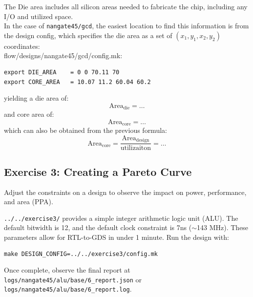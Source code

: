 \documentclass[a4paper,12pt,twoside]{article}
\begin{document}
\begin{enumerate}
\begin{equation}
    \end{equation}
    The Die area includes all silicon areas needed to fabricate the chip, including any I/O and utilized space.\\
    In the case of \texttt{nangate45/gcd}, the easiest location to find this information is from the design config, which specifies the die area as a set of $(x_1,y_1,x_2,y_2)$ coordinates:\\
    flow/designs/nangate45/gcd/config.mk:
    \begin{verbatim}
export DIE_AREA    = 0 0 70.11 70
export CORE_AREA   = 10.07 11.2 60.04 60.2
    \end{verbatim}
    yielding a die area of:
    \begin{equation}\label{EEq2}
        \mathrm{Area_{die}=}\dots
    \end{equation}
    and core area of:
    \begin{equation}\label{EEq3}
        \mathrm{Area_{core}=}\dots
    \end{equation}
    which can also be obtained from the previous formula:
    \begin{equation}\label{EEq4}
        \mathrm{Area_{core}=\frac{Area_{design}}{utilizaiton}=}\dots
    \end{equation}
\end{enumerate}
\subsection{Exercise 3: Creating a Pareto Curve}\label{SE3}
Adjust the constraints on a design to observe the impact on power, performance, and area (PPA).

\texttt{../../exercise3/} provides a simple integer arithmetic logic unit (ALU). The default bitwidth is 12, and the default clock constraint is 7ns ($\sim$143 MHz). These parameters allow for RTL-to-GDS in under 1 minute. Run the design with:
\begin{verbatim}
make DESIGN_CONFIG=../../exercise3/config.mk
\end{verbatim}
Once complete, observe the final report at \texttt{logs/nangate45/alu/base/6\_report.json} or \texttt{logs/nangate45/alu/base/6\_report.log}.
\end{document}
